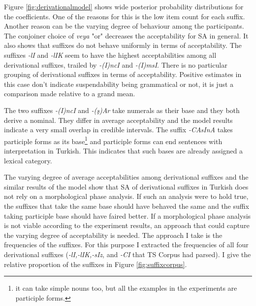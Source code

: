 Figure \ref{fig:derivationalmodel} shows wide posterior probability distributions for the coefficients. One of the reasons for this is the low item count for each suffix. Another reason can be the varying degree of behaviour among the participants. The conjoiner choice of \textit{veya} "or" decreases the acceptability for SA in general. It also shows that suffixes do not behave uniformly in terms of acceptability. The suffixes \textit{-lI} and \textit{-lIK} seem to have the highest acceptabilities among all derivational suffixes, trailed by \textit{-(I)ncI} and \textit{-(I)msI}. There is no particular grouping of derivational suffixes in terms of acceptability. Positive estimates in this case don't indicate suspendability being grammatical or not, it is just a comparison made relative to a grand mean.

The two suffixes \textit{-(I)ncI} and \textit{-(ş)Ar} take numerals as their base and they both derive a nominal. They differ in average acceptability and the model results indicate a very small overlap in credible intervals. The suffix \textit{-CAsInA} takes participle forms as its base\footnote{it can take simple nouns too, but all the examples in the experiments are participle forms.} and  participle forms can end sentences with {\Tsg} interpretation in Turkish. This indicates that such bases are already assigned a lexical category. 

The varying degree of average acceptabilities among derivational suffixes and the similar results of the model show that SA of derivational suffixes in Turkish does not rely on a morphological phase analysis. If such an analysis were to hold true, the suffixes that take the same base should have behaved the same and the suffix taking participle base should have faired better. If a morphological phase analysis is not viable according to the experiment results, an approach that could capture the varying degree of acceptability is needed. The approach I take is the frequencies of the suffixes. For this purpose I extracted the frequencies of all four derivational suffixes (\textit{-lI,-lIK,-sIz}, and \textit{-CI} that TS Corpus \citep{sezer2013ts} had parsed). I give the relative proportion of the suffixes in Figure \ref{fig:suffixcorpus}. 

